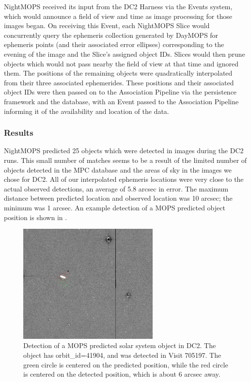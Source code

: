 NightMOPS received its input from the DC2 Harness via the Events
system, which would announce a field of view and time as image
processing for those images began.  On receiving this Event, each
NightMOPS Slice would concurrently query the ephemeris collection
generated by DayMOPS for ephemeris points (and their associated error
ellipses) corresponding to the evening of the image and the Slice's
assigned object IDs.  Slices would then prune objects which would not
pass nearby the field of view at that time and ignored them.  The
positions of the remaining objects were quadratically interpolated
from their three associated ephemerides.  These positions and their
associated object IDs were then passed on to the Association Pipeline
via the persistence framework and the database, with an Event passed
to the Association Pipeline informing it of the availability and
location of the data.


\subsubsection{Results}
NightMOPS predicted 25 objects which were detected in images during
the DC2 runs.  This small number of matches seems to be a result of
the limited number of objects detected in the MPC database and the
areas of sky in the images we chose for DC2.  All of our interpolated
ephemeris locations  were very close to the actual observed
detections, an average of 5.8 arcsec in error.  The maximum
distance between predicted location and observed location was
10 arcsec; the minimum was 1 arcsec.   An example detection of a MOPS
predicted object position is shown in .

\begin{figure}[htb]
\begin{center}
\includegraphics[height=60mm] {figures/MopsPred_rlp0130_705197}
\caption{Detection of a MOPS predicted solar system object in DC2.
The object has orbit\_id=41904, and was detected in Visit 705197.  The
green circle is centered on the predicted position, while the red
circle is centered on the detected position, which is about 6 arcsec away.}
\label{MOPSPredImage}
\end{center}
\end{figure}


